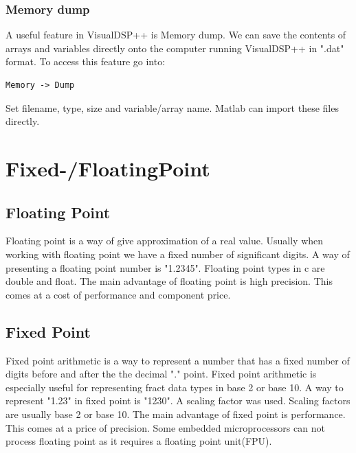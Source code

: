 \subsubsection{Memory dump}
A useful feature in VisualDSP++ is Memory dump. We can save the contents of arrays and variables directly onto the computer running VisualDSP++ in ".dat" format. To access this feature go into:
\begin{verbatim}
Memory -> Dump
\end{verbatim}
Set filename, type, size and variable/array name. Matlab can import these files directly.

\section{Fixed-/FloatingPoint}
\subsection{Floating Point}
Floating point is a way of give approximation of a real value. Usually when working with floating point we have a fixed number of significant digits. A way of presenting a floating point number is "1.2345". Floating point types in c are double and float. The main advantage of floating point is high precision. This comes at a cost of performance and component price.\\
\subsection{Fixed Point}
Fixed point arithmetic is a way to represent a number that has a fixed number of digits before and after the the decimal "." point. Fixed point arithmetic is especially useful for representing fract data types in base 2 or base 10. A way to represent "1.23" in fixed point is "1230". A scaling factor was used. Scaling factors are usually base 2 or base 10. The main advantage of fixed point is performance. This comes at a price of precision. Some embedded microprocessors can not process floating point as it requires a floating point unit(FPU).\\
